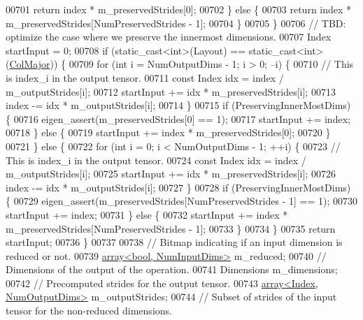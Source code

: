 \begin{DoxyCode}
00701         \textcolor{keywordflow}{return} index * m\_preservedStrides[0];
00702       \} \textcolor{keywordflow}{else} \{
00703         \textcolor{keywordflow}{return} index * m\_preservedStrides[NumPreservedStrides - 1];
00704       \}
00705     \}
00706     \textcolor{comment}{// TBD: optimize the case where we preserve the innermost dimensions.}
00707     Index startInput = 0;
00708     \textcolor{keywordflow}{if} (static\_cast<int>(Layout) == static\_cast<int>(\hyperlink{group__enums_ggaacded1a18ae58b0f554751f6cdf9eb13a0cbd4bdd0abcfc0224c5fcb5e4f6669a}{ColMajor})) \{
00709       \textcolor{keywordflow}{for} (\textcolor{keywordtype}{int} i = NumOutputDims - 1; i > 0; --i) \{
00710         \textcolor{comment}{// This is index\_i in the output tensor.}
00711         \textcolor{keyword}{const} Index idx = index / m\_outputStrides[i];
00712         startInput += idx * m\_preservedStrides[i];
00713         index -= idx * m\_outputStrides[i];
00714       \}
00715       \textcolor{keywordflow}{if} (PreservingInnerMostDims) \{
00716         eigen\_assert(m\_preservedStrides[0] == 1);
00717         startInput += index;
00718       \} \textcolor{keywordflow}{else} \{
00719         startInput += index * m\_preservedStrides[0];
00720       \}
00721     \} \textcolor{keywordflow}{else} \{
00722       \textcolor{keywordflow}{for} (\textcolor{keywordtype}{int} i = 0; i < NumOutputDims - 1; ++i) \{
00723         \textcolor{comment}{// This is index\_i in the output tensor.}
00724         \textcolor{keyword}{const} Index idx = index / m\_outputStrides[i];
00725         startInput += idx * m\_preservedStrides[i];
00726         index -= idx * m\_outputStrides[i];
00727       \}
00728       \textcolor{keywordflow}{if} (PreservingInnerMostDims) \{
00729         eigen\_assert(m\_preservedStrides[NumPreservedStrides - 1] == 1);
00730         startInput += index;
00731       \} \textcolor{keywordflow}{else} \{
00732         startInput += index * m\_preservedStrides[NumPreservedStrides - 1];
00733       \}
00734     \}
00735     \textcolor{keywordflow}{return} startInput;
00736   \}
00737 
00738   \textcolor{comment}{// Bitmap indicating if an input dimension is reduced or not.}
00739   \hyperlink{class_eigen_1_1array}{array<bool, NumInputDims>} m\_reduced;
00740   \textcolor{comment}{// Dimensions of the output of the operation.}
00741   Dimensions m\_dimensions;
00742   \textcolor{comment}{// Precomputed strides for the output tensor.}
00743   \hyperlink{class_eigen_1_1array}{array<Index, NumOutputDims>} m\_outputStrides;
00744   \textcolor{comment}{// Subset of strides of the input tensor for the non-reduced dimensions.}

\end{DoxyCode}
